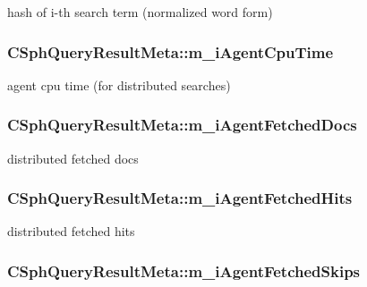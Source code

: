 hash of i-\/th search term (normalized word form) 

\hypertarget{classCSphQueryResultMeta_a8333ab6fcf9a0b825e29d165fc1d6b22}{
\subsubsection[{m\-\_\-i\-Agent\-Cpu\-Time}]{ C\-Sph\-Query\-Result\-Meta\-::m\-\_\-i\-Agent\-Cpu\-Time}}\label{classCSphQueryResultMeta_a8333ab6fcf9a0b825e29d165fc1d6b22}


agent cpu time (for distributed searches) 

\hypertarget{classCSphQueryResultMeta_a920c82ad433a09cb0d40fa3aed43c8f3}{
\subsubsection[{m\-\_\-i\-Agent\-Fetched\-Docs}]{ C\-Sph\-Query\-Result\-Meta\-::m\-\_\-i\-Agent\-Fetched\-Docs}}\label{classCSphQueryResultMeta_a920c82ad433a09cb0d40fa3aed43c8f3}


distributed fetched docs 

\hypertarget{classCSphQueryResultMeta_a67bb36ce07715dfb7cdf204ec2593316}{
\subsubsection[{m\-\_\-i\-Agent\-Fetched\-Hits}]{ C\-Sph\-Query\-Result\-Meta\-::m\-\_\-i\-Agent\-Fetched\-Hits}}\label{classCSphQueryResultMeta_a67bb36ce07715dfb7cdf204ec2593316}


distributed fetched hits 

\hypertarget{classCSphQueryResultMeta_a3ef02b751370172e2d06533ff3877e5a}{
\subsubsection[{m\-\_\-i\-Agent\-Fetched\-Skips}]{ C\-Sph\-Query\-Result\-Meta\-::m\-\_\-i\-Agent\-Fetched\-Skips}}\label{classCSphQueryResultMeta_a3ef02b751370172e2d06533ff3877e5a}


